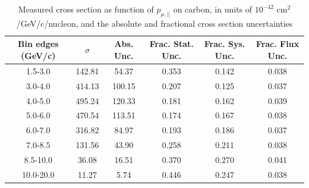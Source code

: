 \documentclass[../main.tex]{subfiles}
\begin{document}
\pagebreak
\begin{turnpage}
\end{turnpage}
\begin{table}
  \centering
  \renewcommand{\arraystretch}{1.15}
  \caption{Measured cross section as function of $p_{\mu,||}$ on carbon, in units of $10^{-42}$ $\text{cm}^2$/GeV/c/nucleon, and the absolute and fractional cross section uncertainties}
    \begin{tabular}{c||c|c||c|c|c}
      Bin edges (GeV/c) &  $\sigma$  &  Abs. Unc.  &  Frac. Stat. Unc.  &  Frac. Sys. Unc.  &  Frac. Flux Unc. \\
      \hline
      \hline
      1.5-3.0 & 142.81 & 54.37 & 0.353 & 0.142 & 0.038\\
      3.0-4.0 & 414.13 & 100.15 & 0.207 & 0.125 & 0.037\\
      4.0-5.0 & 495.24 & 120.33 & 0.181 & 0.162 & 0.039\\
      5.0-6.0 & 470.54 & 113.51 & 0.174 & 0.167 & 0.038\\
      6.0-7.0 & 316.82 & 84.97 & 0.193 & 0.186 & 0.037\\
      7.0-8.5 & 131.56 & 43.90 & 0.258 & 0.211 & 0.038\\
      8.5-10.0 & 36.08 & 16.51 & 0.370 & 0.270 & 0.041\\
      10.0-20.0 & 11.27 & 5.74 & 0.446 & 0.247 & 0.038
    \end{tabular}
  \label{tbl:datanucleonnuc6muon_pza}
\end{table}
\begin{table}
  \centering
  \renewcommand{\arraystretch}{1.15}
  \caption{Statistical covariance matrix of measured cross section as function of $p_{\mu,||}$ on carbon, in units of $10^{-84}$ $(\text{cm}^2$/GeV/c/nucleon$)^2$}
  \label{tbl:statnucleonnuc6muon_pzb}
\end{table}
\end{document}
